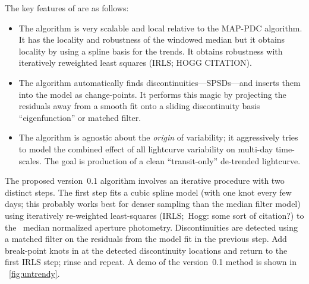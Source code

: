 \documentclass[letterpaper,12pt,preprint]{hack_aastex}
\newcommand{\Untrendy}{\package{Untrendy}}
\begin{document}
The key features of \Untrendy are as follows:
\begin{itemize}
\item The algorithm is very scalable and local relative to the MAP-PDC
  algorithm.  It has the locality and robustness of the
  windowed median but
  it obtains locality by using a spline basis for the trends.  It obtains
  robustness with iteratively reweighted least squares (IRLS; HOGG CITATION).
\item The algorithm automatically finds discontinuities---SPSDs---and inserts
  them into the model as change-points.
  It performs this magic by projecting the residuals away from a smooth fit
  onto a sliding discontinuity basis ``eigenfunction'' or matched filter.
\item The algorithm is agnostic about the \emph{origin} of variability; it
  aggressively tries to model the combined effect of all lightcurve variability
  on multi-day time-scales.
  The goal is production of a clean ``transit-only'' de-trended lightcurve.
\end{itemize}

The proposed version~0.1 algorithm involves an iterative procedure with two distinct
steps.
The first step fits a cubic spline model (with one knot every few days; this
probably works best for denser sampling than the median filter model) using
iteratively re-weighted least-squares (IRLS;\ Hogg: some sort of citation?) to
the \Kepler\ median normalized aperture photometry.
Discontinuities are detected using a matched filter on the residuals
from the model fit in the previous step.
Add break-point knots in at the detected discontinuity locations and return to the first IRLS
step; rinse and repeat.  A demo of the version~0.1 method is shown in
\figurename~\ref{fig:untrendy}.%
\end{document}
